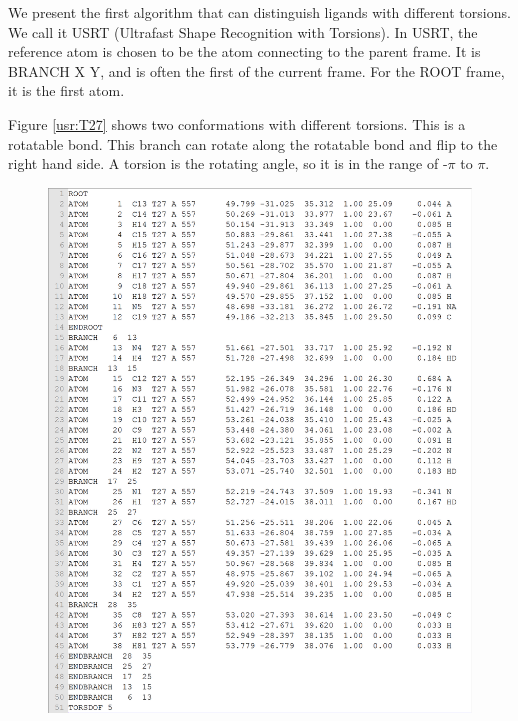We present the first algorithm that can distinguish ligands with different torsions. We call it USRT (Ultrafast Shape Recognition with Torsions). In USRT, the reference atom is chosen to be the atom connecting to the parent frame. It is BRANCH X Y, and is often the first of the current frame. For the ROOT frame, it is the first atom.

Figure \ref{usr:T27} shows two conformations with different torsions. This is a rotatable bond. This branch can rotate along the rotatable bond and flip to the right hand side. A torsion is the rotating angle, so it is in the range of -$\pi$ to $\pi$. 

\begin{figure}
\centering
\includegraphics[width=1.36\textwidth,natwidth=1899,natheight=2350]{../usrt/T27CrystalPDBQT.png}
\endminipage
{}
\centering

\end{figure}
